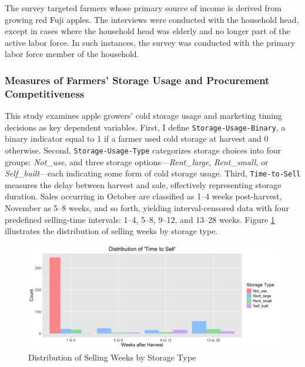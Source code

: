 \documentclass[12pt]{article}
\begin{document}
The survey targeted farmers whose primary source of income is derived from growing red Fuji apples. The interviews were conducted with the household head, except in cases where the household head was elderly and no longer part of the active labor force. In such instances, the survey was conducted with the primary labor force member of the household.



\subsubsection{Measures of Farmers' Storage Usage and Procurement Competitiveness}
\noindent This study examines apple growers' cold storage usage and marketing timing decisions as key dependent variables. First, I define \texttt{Storage-Usage-Binary}, a binary indicator equal to 1 if a farmer used cold storage at harvest and 0 otherwise. Second, \texttt{Storage-Usage-Type} categorizes storage choices into four groups: \textit{Not\_use}, and three storage options—\textit{Rent\_large}, \textit{Rent\_small}, or \textit{Self\_built}—each indicating some form of cold storage usage. Third, \texttt{Time-to-Sell} measures the delay between harvest and sale, effectively representing storage duration. Sales occurring in October are classified as 1–4 weeks post-harvest, November as 5–8 weeks, and so forth, yielding interval-censored data with four predefined selling-time intervals: 1–4, 5–8, 9–12, and 13–28 weeks. Figure \ref{Figure: selling weeks distribution} illustrates the distribution of selling weeks by storage type.

\begin{figure}[H]
\centering
\includegraphics[width=1\textwidth]{figures/selling_weeks_distribution.png}
\caption{Distribution of Selling Weeks by Storage Type}
\label{Figure: selling weeks distribution}
\end{figure}
\end{document}
